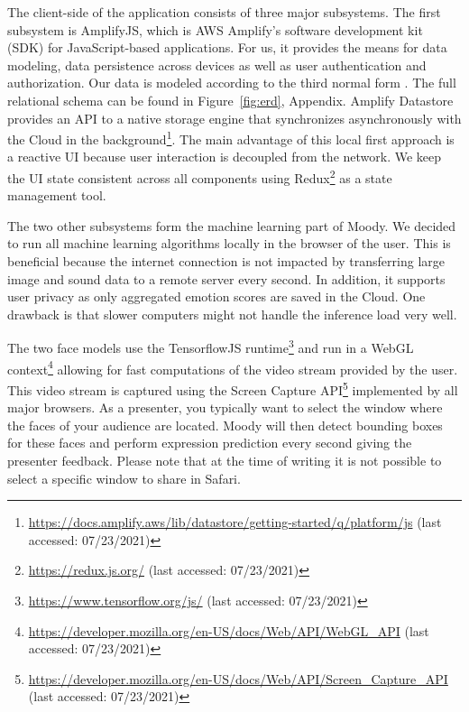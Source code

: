 The client-side of the application consists of three major subsystems. The first subsystem is AmplifyJS, which is AWS Amplify's software development kit (SDK) for JavaScript-based applications. For us, it provides the means for data modeling, data persistence across devices as well as user authentication and authorization. Our data is modeled according to the third normal form \cite{codd_further_1972}. The full relational schema can be found in Figure~\ref{fig:erd}, Appendix. Amplify Datastore provides an API to a native storage engine that synchronizes asynchronously with the Cloud in the background\footnote{\url{https://docs.amplify.aws/lib/datastore/getting-started/q/platform/js} (last accessed: 07/23/2021)}. The main advantage of this local first approach is a reactive UI because user interaction is decoupled from the network. We keep the UI state consistent across all components using Redux\footnote{\url{https://redux.js.org/} (last accessed: 07/23/2021)} as a state management tool.

The two other subsystems form the machine learning part of Moody. We decided to run all machine learning algorithms locally in the browser of the user. This is beneficial because the internet connection is not impacted by transferring large image and sound data to a remote server every second. In addition, it supports user privacy as only aggregated emotion scores are saved in the Cloud. One drawback is that slower computers might not handle the inference load very well.

The two face models use the TensorflowJS runtime\footnote{\url{https://www.tensorflow.org/js/} (last accessed: 07/23/2021)} and run in a WebGL context\footnote{\url{https://developer.mozilla.org/en-US/docs/Web/API/WebGL_API} (last accessed: 07/23/2021)} allowing for fast computations of the video stream provided by the user. This video stream is captured using the Screen Capture API\footnote{\url{https://developer.mozilla.org/en-US/docs/Web/API/Screen_Capture_API} (last accessed: 07/23/2021)} implemented by all major browsers. As a presenter, you typically want to select the window where the faces of your audience are located. Moody will then detect bounding boxes for these faces and perform expression prediction every second giving the presenter feedback. Please note that at the time of writing it is not possible to select a specific window to share in Safari.


